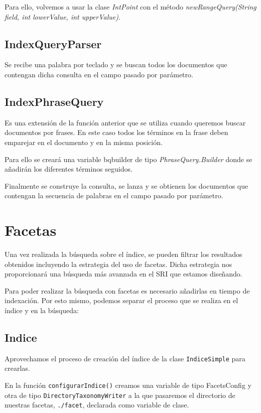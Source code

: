Para ello, volvemos a usar la clase \textit{IntPoint} con el método \textit{newRangeQuery(String field, int lowerValue, int upperValue)}.


\subsection{IndexQueryParser}
Se recibe una palabra por teclado y se buscan todos los documentos que contengan dicha consulta en el campo pasado por parámetro.


\subsection{IndexPhraseQuery}
Es una extensión de la función anterior que se utiliza cuando queremos buscar documentos por frases. En este caso todos los términos en la frase deben emparejar en el documento y en la misma posición.

Para ello se creará una variable bqbuilder de tipo \textit{PhraseQuery.Builder} donde se añadirán los diferentes términos seguidos.

Finalmente se construye la consulta, se lanza y se obtienen los documentos que contengan la secuencia de palabras en el campo pasado por parámetro.



\section{Facetas}
\hspace{1cm} Una vez realizada la búsqueda sobre el índice, se pueden filtrar los resultados obtenidos incluyendo la estrategia del uso de facetas. Dicha estrategia nos proporcionará una búsqueda más avanzada en el SRI que estamos diseñando. 


Para poder realizar la búsqueda con facetas es necesario añadirlas en tiempo de indexación. Por esto mismo, podemos separar el proceso que se realiza en el índice y en la búsqueda:



\subsection{Indice}


Aprovechamos el proceso de creación del índice de la clase \texttt{IndiceSimple} para crearlas. 

En la función \texttt{configurarIndice()} creamos una variable de tipo FacetsConfig y otra de tipo \texttt{DirectoryTaxonomyWriter} a la que pasaremos el directorio de nuestras facetas, \texttt{./facet}, declarada como variable de clase. \\

